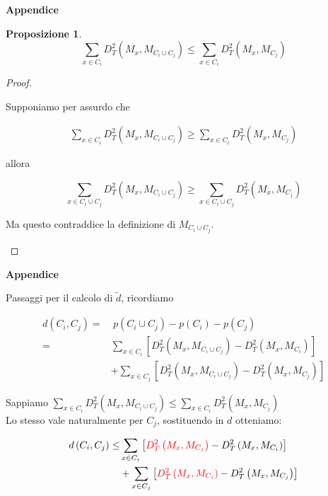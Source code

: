 \documentclass[a4, landscape]{seminar}
\theoremstyle{definition}
\newtheorem*{prop}{Proposizione}
\def\bc{\begin{center}}
\def\ec{\end{center}}
\def\bs{\begin{slide}\begingroup\small}
\def\es{\endgroup\end{slide}}
\begin{document}
\bs
\bc{\bf\color{blue}Appendice}\ec
\begin{prop}
  \begin{equation*}
    \sum_{x \in C_{i}} D_{T}^{2}\left(M_{x}, M_{C_{i} \cup C_{j}}\right) \leq \sum_{x \in C_{i}} D_{T}^{2}\left(M_{x}, M_{C_{j}}\right)
  \end{equation*}
\end{prop}
\begin{proof}\hfill
    \begin{center}
    Supponiamo per assurdo che
    \end{center}
    \begin{gather*}
    \sum _{x\in C_{i}} D_{T}^{2}( M_{x} ,M_{C_{i} \cup C_{j}}) \geq \sum _{x\in C_{i}} D_{T}^{2}( M_{x} ,M_{C_{j}})
    \end{gather*}
    \begin{center}
    allora
    \end{center}
    \begin{equation*}
    \sum _{x\in C_{i} \cup C_{j}} D_{T}^{2}( M_{x} ,M_{C_{i} \cup C_{j}}) \geq \sum _{x\in C_{i} \cup C_{j}} D_{T}^{2}( M_{x} ,M_{C_{j}})
    \end{equation*}
    \begin{center}
    Ma questo contraddice la definizione di $\displaystyle M_{C_{i} \cup C_{j}} .$
    \end{center}
\end{proof}
\es

\bs
\bc{\bf\color{blue}Appendice}\ec
Passaggi per il calcolo di $\tilde{d}$, ricordiamo

\begin{equation*}
\begin{aligned}
d(C_i, C_j) =& \ p(C_i\cup C_j) - p(C_i) - p(C_j) \\
=& \sum_{x \in C_{i}} \left[D_{T}^{2}\left(M_{x}, M_{C_{i} \cup C_{j}}\right)- D_{T}^{2}\left(M_{x}, M_{C_{i}}\right)\right] \\
&+\sum_{x \in C_{j}} \left[D_{T}^{2}\left(M_{x}, M_{C_{i} \cup C_{j}}\right)-D_{T}^{2}\left(M_{x}, M_{C_{j}}\right)\right]
\end{aligned}
\end{equation*}

Sappiamo $\sum_{x \in C_{i}} D_{T}^{2}\left(M_{x}, M_{C_{i} \cup C_{j}}\right) \leq \sum_{x \in C_{i}} D_{T}^{2}\left(M_{x}, M_{C_{j}}\right)$ \\
Lo stesso vale naturalmente per $C_j$, sostituendo in $d$ otteniamo:

\begin{equation*}
\begin{aligned}
  d\left(C_{i}, C_{j}\right) \leq & \sum_{x \in C_{i}}\left[\textcolor{red}{D_{T}^{2}\left(M_{x}, M_{C_{j}}\right)}-D_{T}^{2}\left(M_{x}, M_{C_{i}}\right)\right] \\
  &+\sum_{x \in C_{j}}\left[\textcolor{red}{D_{T}^{2}\left(M_{x}, M_{C_{i}}\right)}-D_{T}^{2}\left(M_{x}, M_{C_{j}}\right)\right]
  \end{aligned}
\end{equation*}
\es
\end{document}
